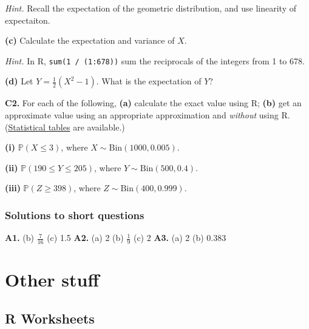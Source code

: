 \documentclass[
  a4paper,
]{book}
\theoremstyle{definition}
\theoremstyle{definition}
\theoremstyle{definition}
\theoremstyle{definition}
\theoremstyle{remark}
\begin{document}
\begin{myanswers}
\emph{Hint.} Recall the expectation of the geometric distribution, and use linearity of expectaiton.

\end{myanswers}

\textbf{(c)} Calculate the expectation and variance of \(X\).

\begin{myanswers}
\emph{Hint.} In R, \texttt{sum(1\ /\ (1:678))} sum the reciprocals of the integers from 1 to 678.

\end{myanswers}

\textbf{(d)} Let \(Y = \tfrac12 (X^2 - 1)\). What is the expectation of \(Y\)?

\textbf{C2.} For each of the following, \textbf{(a)} calculate the exact value using R; \textbf{(b)} get an approximate value using an appropriate approximation and \emph{without} using R. (\href{https://mpaldridge.github.io/math1710/stat-tab.pdf}{Statistical tables} are available.)

\textbf{(i)} \(\mathbb P(X \leq 3)\), where \(X \sim \mathrm{Bin}(1000, 0.005)\).

\textbf{(ii)} \(\mathbb P(190 \leq Y \leq 205)\), where \(Y \sim \mathrm{Bin}(500, 0.4)\).

\textbf{(iii)} \(\mathbb P(Z \geq 398)\), where \(Z \sim \mathrm{Bin}(400, 0.999)\).

\hypertarget{P5-short-sols}{%
\section*{Solutions to short questions}\label{P5-short-sols}}

\textbf{A1.} (b) \(\tfrac{7}{16}\) (c) 1.5 \textbf{A2.} (a) 2 (b) \(\tfrac19\) (c) 2 \textbf{A3.} (a) 2 (b) 0.383

\hypertarget{part-other-stuff}{%
\part*{Other stuff}\label{part-other-stuff}}

\hypertarget{R}{%
\chapter*{R Worksheets}\label{R}}
\end{document}
